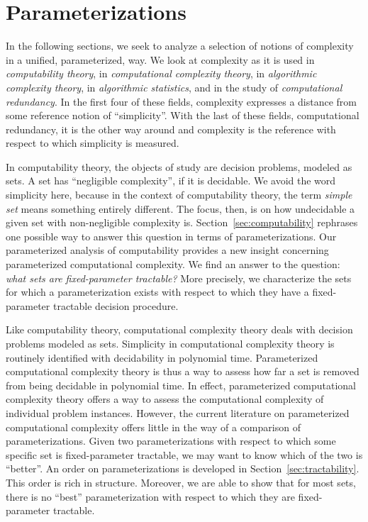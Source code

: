 \chapter{Parameterizations}
\label{ch:parameterizations}%

In the following sections, we seek to analyze a selection of notions of complexity in a unified, parameterized, way.
We look at complexity as it is used in \emph{computability theory}, in \emph{computational complexity theory}, in \emph{algorithmic complexity theory}, in \emph{algorithmic statistics}, and in the study of \emph{computational redundancy}.
In the first four of these fields, complexity expresses a distance from some reference notion of \enquote{simplicity}.
With the last of these fields, computational redundancy, it is the other way around and complexity is the reference with respect to which simplicity is measured.

In computability theory, the objects of study are decision problems, modeled as sets.
A set has \enquote{negligible complexity}, if it is decidable.
We avoid the word simplicity here, because in the context of computability theory, the term \emph{simple set} means something entirely different.
The focus, then, is on how undecidable a given set with non-negligible complexity is.
Section~\ref{sec:computability} rephrases one possible way to answer this question in terms of parameterizations.
Our parameterized analysis of computability provides a new insight concerning parameterized computational complexity.
We find an answer to the question: \emph{what sets are fixed-parameter tractable?}
More precisely, we characterize the sets for which a parameterization exists with respect to which they have a fixed-parameter tractable decision procedure.

Like computability theory, computational complexity theory deals with decision problems modeled as sets.
Simplicity in computational complexity theory is routinely identified with decidability in polynomial time.
Parameterized computational complexity theory is thus a way to assess how far a set is removed from being decidable in polynomial time.
In effect, parameterized computational complexity theory offers a way to assess the computational complexity of individual problem instances.
However, the current literature on parameterized computational complexity offers little in the way of a comparison of parameterizations.
Given two parameterizations with respect to which some specific set is fixed-parameter tractable, we may want to know which of the two is \enquote{better}.
An order on parameterizations is developed in Section~\ref{sec:tractability}.
This order is rich in structure.
Moreover, we are able to show that for most sets, there is no \enquote{best} parameterization with respect to which they are fixed-parameter tractable.

